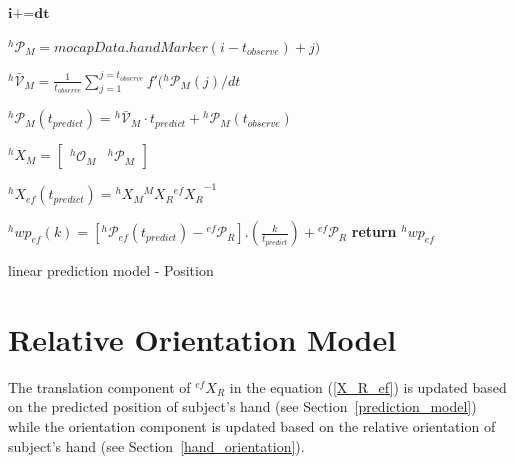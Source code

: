 \begin{algorithm}[H] \label{positionalgo}
	\DontPrintSemicolon
	
	
	
	\textit{$\textbf{i+=dt}$} 
	
	{
		{
			${}^{h}\mathcal{P}_M= \textit{mocapData}.handMarker(i-t_{observe})+j)$	
		}
		
		${}^{h}\mathcal{\bar{V}}_{M} = \frac{1}{t_{observe}}{\sum_{j=1}^{j=t_{observe}} f'({}^{h}\mathcal{P}_{M}(j)/dt }$\newline 
		
		
		${}^{h}\mathcal{P}_M(t_{predict}) = {}^{h}\mathcal{\bar{V}}_{M} \cdot t_{predict}  + {}^{h}\mathcal{P}_{M}(t_{observe})$ %
		
	
		${}^{h}{X}_M= \begin{bmatrix} {}^{h}\mathcal{O}_{M} &  {}^{h}\mathcal{P}_M	\end{bmatrix}$ \newline
			
		${}^{h}{X}_{ef}(t_{predict}) =  {}^{h}{X}_M  {}^{M}{X}_R {{}^{ef}{X}_R}^{-1}$ \newline
		

		{
			{
				${}^{h}wp_{ef}(k) = [{}^{h}\mathcal{P}_{ef}(t_{predict}) - {}^{ef}\mathcal{P}_{R}] . (\frac{k}{t_{predict}})  + {}^{ef}\mathcal{P}_{R} $ 
			}	
			\textbf{return} $ {}^{h}wp_{ef} $
		}
	}
	\caption{linear prediction model - Position}
\end{algorithm}


\newpage
\section{Relative Orientation Model}\label{relOri}
The translation component of ${}^{ef}{X}_R $ in the equation (\ref{X_R_ef}) is updated based on the predicted position of subject's hand (see Section~\ref{prediction_model}) while the orientation component is updated based on the relative orientation of subject's hand (see Section~\ref{hand_orientation}).

